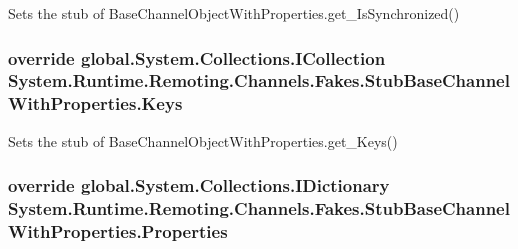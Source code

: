 Sets the stub of Base\-Channel\-Object\-With\-Properties.\-get\-\_\-\-Is\-Synchronized()

\hypertarget{class_system_1_1_runtime_1_1_remoting_1_1_channels_1_1_fakes_1_1_stub_base_channel_with_properties_ab46eff8bef965ef733462de1dfeb4e56}{
\subsubsection[{Keys}]{\setlength{\rightskip}{0pt plus 5cm}override global.\-System.\-Collections.\-I\-Collection System.\-Runtime.\-Remoting.\-Channels.\-Fakes.\-Stub\-Base\-Channel\-With\-Properties.\-Keys\hspace{0.3cm}{\ttfamily [get]}}}\label{class_system_1_1_runtime_1_1_remoting_1_1_channels_1_1_fakes_1_1_stub_base_channel_with_properties_ab46eff8bef965ef733462de1dfeb4e56}


Sets the stub of Base\-Channel\-Object\-With\-Properties.\-get\-\_\-\-Keys()

\hypertarget{class_system_1_1_runtime_1_1_remoting_1_1_channels_1_1_fakes_1_1_stub_base_channel_with_properties_a2b97ab883a84edae085bec7f3ec70019}{
\subsubsection[{Properties}]{\setlength{\rightskip}{0pt plus 5cm}override global.\-System.\-Collections.\-I\-Dictionary System.\-Runtime.\-Remoting.\-Channels.\-Fakes.\-Stub\-Base\-Channel\-With\-Properties.\-Properties\hspace{0.3cm}{\ttfamily [get]}}}\label{class_system_1_1_runtime_1_1_remoting_1_1_channels_1_1_fakes_1_1_stub_base_channel_with_properties_a2b97ab883a84edae085bec7f3ec70019}


